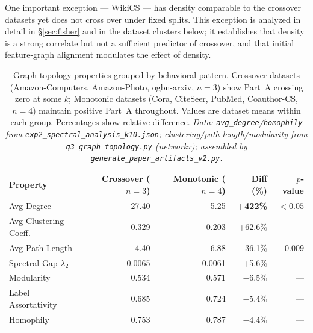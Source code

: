 \documentclass[11pt]{article}
\begin{document}
One important exception --- WikiCS --- has density comparable to the crossover
datasets yet does not cross over under fixed splits.  This exception is analyzed
in detail in \S\ref{sec:fisher} and in the dataset clusters below; it establishes
that density is a strong correlate but not a sufficient predictor of crossover,
and that initial feature-graph alignment modulates the effect of density.
\begin{table}[H]
\centering
\caption{Graph topology properties grouped by behavioral pattern.
Crossover datasets (Amazon-Computers, Amazon-Photo, ogbn-arxiv, $n{=}3$) show Part~A
crossing zero at some $k$; Monotonic datasets (Cora, CiteSeer, PubMed, Coauthor-CS,
$n{=}4$) maintain positive Part~A throughout.
Values are dataset means within each group. Percentages show relative difference.
\textit{\scriptsize Data: \texttt{avg\_degree}/\texttt{homophily} from \texttt{exp2\_spectral\_analysis\_k10.json};
clustering/path-length/modularity from \texttt{q3\_graph\_topology.py} (networkx);
assembled by \texttt{generate\_paper\_artifacts\_v2.py}.}}
\label{tab:graph_properties}
\begin{tabular}{lrrrr}
\toprule
Property & Crossover ($n{=}3$) & Monotonic ($n{=}4$) & Diff (\%) & $p$-value \\
\midrule
Avg Degree              & 27.40 & 5.25  & \textbf{+422\%} & $<0.05$ \\
Avg Clustering Coeff.   & 0.329 & 0.203 & +62.6\%         & ---     \\
Avg Path Length         & 4.40  & 6.88  & $-$36.1\%       & 0.009   \\
Spectral Gap $\lambda_2$ & 0.0065 & 0.0061 & +5.6\%       & ---     \\
Modularity              & 0.534 & 0.571 & $-$6.5\%        & ---     \\
Label Assortativity     & 0.685 & 0.724 & $-$5.4\%        & ---     \\
Homophily               & 0.753 & 0.787 & $-$4.4\%        & ---     \\
\bottomrule
\end{tabular}
\end{table}
\end{document}
